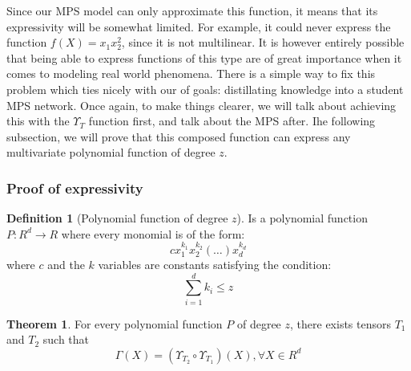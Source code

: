 \documentclass{article}
\theoremstyle{definition}
\newtheorem{definition}{Definition}[section]
\newtheorem{theorem}{Theorem}[section]
\theoremstyle{definition}
\begin{document}
Since our MPS model can only approximate this function, it means that its expressivity
will be somewhat limited. For example, it could never express the function $f(X) = x_1x_2^2$, since it is not multilinear. It is however entirely possible that being able to express functions of this type are of great importance when it comes to modeling real world phenomena. There is a simple way to fix this problem which ties nicely with our of goals: distillating knowledge into a student MPS network. Once again, to make things clearer, we will talk about achieving this with the $\Upsilon_{T}$ function first, and talk about the MPS after. Ihe following subsection, we will prove that this composed function can express
any multivariate polynomial function of degree $z$.

\subsubsection{Proof of expressivity}
\begin{definition}[Polynomial function of degree $z$]

    Is a polynomial function $P: R^d \to R$ where every monomial is of the form:
    \[
        cx_1^{k_1} x_2^{k_2}(\dots)x_d^{k_d}
    \]
    where $c$ and the $k$ variables are constants satisfying the condition:
    \[
        \sum_{i=1}^{d}k_i \leq z
    \]
\end{definition}


\begin{theorem}
    For every polynomial function $P$ of degree $z$, there exists tensors $T_1$ and $T_2$ such that
    \[ \Gamma(X) = \left(\Upsilon_{T_2} \circ \Upsilon_{T_1}\right) (X), \forall X \in R^d\]
\end{theorem}
\end{document}
